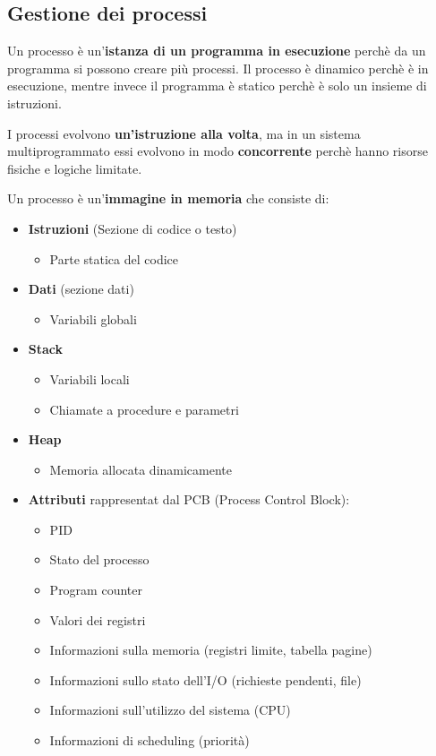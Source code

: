 \documentclass[a4paper]{article}
\begin{document}
\subsection{Gestione dei processi}
Un processo è un'\textbf{istanza di un programma in esecuzione} perchè da un programma
si possono creare più processi. Il processo è dinamico perchè è in esecuzione, mentre
invece il programma è statico perchè è solo un insieme di istruzioni.

\noindent
I processi evolvono \textbf{un'istruzione alla volta}, ma in un sistema multiprogrammato
essi evolvono in modo \textbf{concorrente} perchè hanno risorse fisiche e logiche limitate.

\noindent
Un processo è un'\textbf{immagine in memoria} che consiste di:
\begin{itemize}
  \item \textbf{Istruzioni} (Sezione di codice o testo)
    \begin{itemize}
      \item Parte statica del codice
    \end{itemize}

  \item \textbf{Dati} (sezione dati)
    \begin{itemize}
      \item Variabili globali
    \end{itemize}

  \item \textbf{Stack}
    \begin{itemize}
      \item Variabili locali
      \item Chiamate a procedure e parametri
    \end{itemize}

  \item \textbf{Heap}
    \begin{itemize}
      \item Memoria allocata dinamicamente
    \end{itemize}

  \item \textbf{Attributi} rappresentat dal PCB (Process Control Block):
    \begin{itemize}
      \item PID
      \item Stato del processo
      \item Program counter
      \item Valori dei registri
      \item Informazioni sulla memoria (registri limite, tabella pagine)
      \item Informazioni sullo stato dell'I/O (richieste pendenti, file)
      \item Informazioni sull'utilizzo del sistema (CPU)
      \item Informazioni di scheduling (priorità)
    \end{itemize}
\end{itemize}
\end{document}

